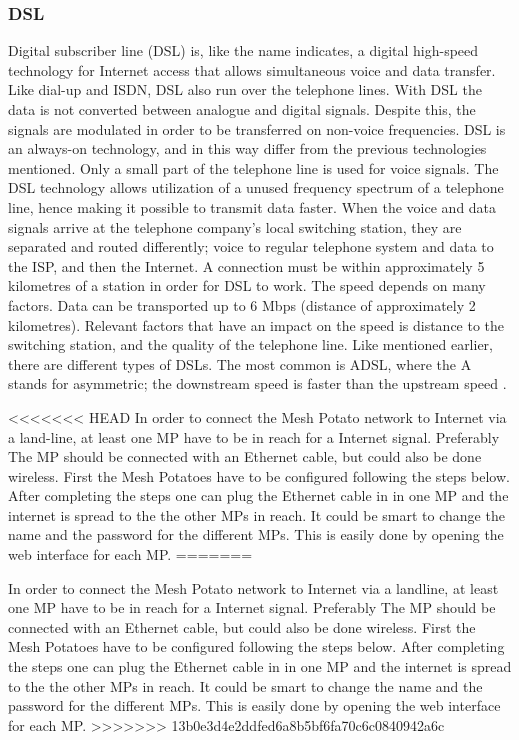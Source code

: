 \subsubsection{DSL}
Digital subscriber line (DSL) is, like the name indicates, a digital high-speed technology for Internet access that allows simultaneous voice and data transfer. Like dial-up and ISDN, DSL also run over the telephone lines. With DSL the data is not converted between analogue and digital signals. Despite this, the signals are modulated in order to be transferred on non-voice frequencies. DSL is an always-on technology, and in this way differ from the previous technologies mentioned. Only a small part of the telephone line is used for voice signals. The DSL technology allows utilization of a unused frequency spectrum of a telephone line, hence making it possible to transmit data faster. When the voice and data signals arrive at the telephone company's local switching station, they are separated and routed differently; voice to regular telephone system and data to the ISP, and then the Internet. A connection must be within approximately 5 kilometres of a station in order for DSL to work. The speed depends on many factors. Data can be transported up to 6 Mbps (distance of approximately 2 kilometres). Relevant factors that have an impact on the speed is distance to the switching station, and the quality of the telephone line. Like mentioned earlier, there are different types of DSLs. The most common is ADSL, where the A stands for asymmetric; the downstream speed is faster than the upstream speed \cite{differentuplinks}.

<<<<<<< HEAD
In order to connect the Mesh Potato network to Internet via a land-line, at least one MP have to be in reach for a Internet signal. Preferably The MP should be connected with an Ethernet cable, but could also be done wireless.  First the Mesh Potatoes have to be configured following the steps below. After completing the steps one can plug the Ethernet cable in in one MP and the internet is spread to the the other MPs in reach. It could be smart to change the name and the password for the different MPs. This is easily done by opening the web interface for each MP. 
=======




In order to connect the Mesh Potato network to Internet via a landline, at least one MP have to be in reach for a Internet signal. Preferably The MP should be connected with an Ethernet cable, but could also be done wireless.  First the Mesh Potatoes have to be configured following the steps below. After completing the steps one can plug the Ethernet cable in in one MP and the internet is spread to the the other MPs in reach. It could be smart to change the name and the password for the different MPs. This is easily done by opening the web interface for each MP. 
>>>>>>> 13b0e3d4e2ddfed6a8b5bf6fa70c6c0840942a6c

